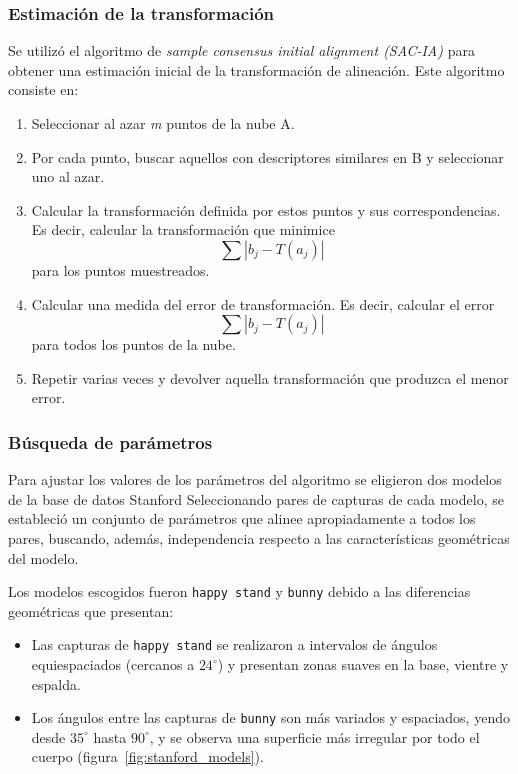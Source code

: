 		\subsubsection{Estimación de la transformación}
			Se utilizó el algoritmo de \emph{sample consensus initial alignment
			(SAC-IA)} para obtener una estimación inicial de la transformación de alineación.
			Este algoritmo consiste en:
			\begin{enumerate}
				\item Seleccionar al azar \emph{m} puntos de la nube A.
				\item Por cada punto, buscar aquellos con descriptores similares en B y seleccionar uno al azar.
				\item Calcular la transformación definida por estos puntos y sus correspondencias.
					Es decir, calcular la transformación que minimice
					\[ \sum |b_j - T(a_j)| \]
					para los puntos muestreados.
				\item Calcular una medida del error de transformación.
					Es decir, calcular el error
					\[ \sum |b_j - T(a_j)| \]
					para todos los puntos de la nube.
				\item Repetir varias veces y devolver aquella transformación que produzca el menor error.\cite{Rusu:2009:FPF:1703435.1703733}
			\end{enumerate}

		\subsubsection{Búsqueda de parámetros}
			Para ajustar los valores de los parámetros del algoritmo
			se eligieron dos modelos de la base de datos Stanford\cite{StanfordScanRep}
			Seleccionando pares de capturas de cada modelo, se estableció un conjunto de parámetros que alinee apropiadamente a todos los pares,
			buscando, además, independencia respecto a las características geométricas del modelo.

			Los modelos escogidos fueron \texttt{happy stand} y \texttt{bunny} debido a las diferencias geométricas que presentan:
			\begin{itemize}
				\item Las capturas de \texttt{happy stand} se realizaron a intervalos de ángulos equiespaciados (cercanos a $24^{\circ}$) y
					presentan zonas suaves en la base, vientre y espalda.
				\item Los ángulos entre las capturas de \texttt{bunny} son más variados y espaciados, yendo desde $35^{\circ}$ hasta $90^{\circ}$,
				y se observa una superficie más irregular por todo el cuerpo (figura~\ref{fig:stanford_models}).
			\end{itemize}

